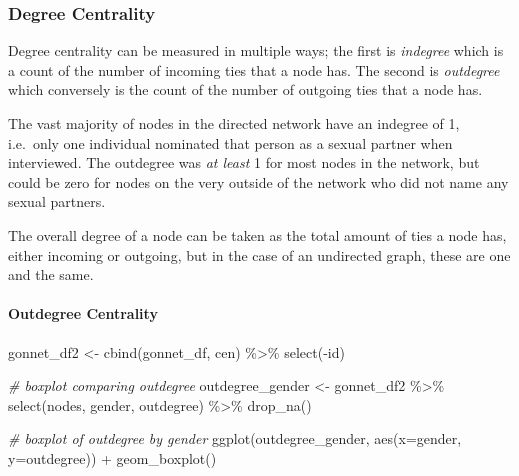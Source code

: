 \documentclass[12pt]{article}
\newenvironment{Shaded}{\begin{snugshade}}{\end{snugshade}}
\newcommand{\AttributeTok}[1]{\textcolor[rgb]{0.77,0.63,0.00}{#1}}
\newcommand{\CommentTok}[1]{\textcolor[rgb]{0.56,0.35,0.01}{\textit{#1}}}
\newcommand{\FunctionTok}[1]{\textcolor[rgb]{0.00,0.00,0.00}{#1}}
\newcommand{\NormalTok}[1]{#1}
\newcommand{\OtherTok}[1]{\textcolor[rgb]{0.56,0.35,0.01}{#1}}
\newcommand{\SpecialCharTok}[1]{\textcolor[rgb]{0.00,0.00,0.00}{#1}}
\begin{document}
\hypertarget{degree-centrality}{%
\subsubsection{Degree Centrality}\label{degree-centrality}}

Degree centrality can be measured in multiple ways; the first is \emph{indegree} which is a count of the number of incoming ties that a node has. The second is \emph{outdegree} which conversely is the count of the number of outgoing ties that a node has.

The vast majority of nodes in the directed network have an indegree of 1, i.e.~only one individual nominated that person as a sexual partner when interviewed. The outdegree was \emph{at least} 1 for most nodes in the network, but could be zero for nodes on the very outside of the network who did not name any sexual partners.

The overall degree of a node can be taken as the total amount of ties a node has, either incoming or outgoing, but in the case of an undirected graph, these are one and the same.

\hypertarget{outdegree-centrality}{%
\paragraph{Outdegree Centrality}\label{outdegree-centrality}}

\begin{Shaded}
\begin{Highlighting}[]
\NormalTok{gonnet\_df2 }\OtherTok{\textless{}{-}} \FunctionTok{cbind}\NormalTok{(gonnet\_df, cen) }\SpecialCharTok{\%\textgreater{}\%} \FunctionTok{select}\NormalTok{(}\SpecialCharTok{{-}}\NormalTok{id)}

\CommentTok{\# boxplot comparing outdegree}
\NormalTok{outdegree\_gender }\OtherTok{\textless{}{-}}\NormalTok{ gonnet\_df2 }\SpecialCharTok{\%\textgreater{}\%} 
  \FunctionTok{select}\NormalTok{(nodes, gender, outdegree) }\SpecialCharTok{\%\textgreater{}\%} 
  \FunctionTok{drop\_na}\NormalTok{()}

\CommentTok{\# boxplot of outdegree by gender}
\FunctionTok{ggplot}\NormalTok{(outdegree\_gender, }\FunctionTok{aes}\NormalTok{(}\AttributeTok{x=}\NormalTok{gender, }\AttributeTok{y=}\NormalTok{outdegree)) }\SpecialCharTok{+} 
  \FunctionTok{geom\_boxplot}\NormalTok{()}
\end{Highlighting}
\end{Shaded}
\end{document}

